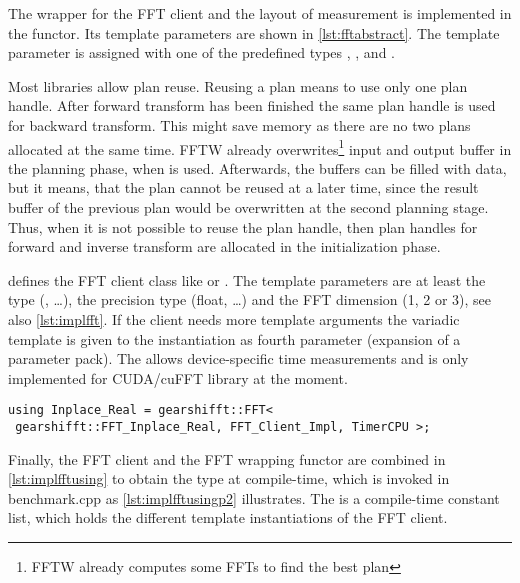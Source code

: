The wrapper for the FFT client and the layout of measurement is implemented in the  functor.
Its template parameters are shown in \cref{lst:fftabstract}. 
The template parameter  is assigned with one of the predefined types , ,  and .

Most libraries allow plan reuse.
Reusing a plan means to use only one plan handle. After forward transform has been finished the same plan handle is used for backward transform.
This might save memory as there are no two plans allocated at the same time. FFTW already overwrites\footnote{FFTW already computes some FFTs to find the best plan} input and output buffer in the planning phase, when  is used. Afterwards, the buffers can be filled with data, but it means, that the plan cannot be reused at a later time, since the result buffer of the previous plan would be overwritten at the second planning stage.
Thus, when it is not possible to reuse the plan handle, then plan handles for forward and inverse transform are allocated in the initialization phase.

 defines the FFT client class like  or .
The template parameters are at least the  type (, \ldots), the precision type (float, \ldots) and the FFT dimension (1, 2 or 3), see also \cref{lst:implfft}. If the client needs more template arguments the variadic template  is given to the  instantiation as fourth parameter (expansion of a parameter pack).
The  allows device-specific time measurements and is only implemented for CUDA/cuFFT library at the moment.

\begin{lstlisting}[caption={Define FFT client types for corresponding FFTs},label={lst:implfftusing}]
using Inplace_Real = gearshifft::FFT<
 gearshifft::FFT_Inplace_Real, FFT_Client_Impl, TimerCPU >;
\end{lstlisting}

Finally, the FFT client and the FFT wrapping functor are combined in \cref{lst:implfftusing} to obtain the type at compile-time, which is invoked in benchmark.cpp as \cref{lst:implfftusingp2} illustrates. The  is a compile-time constant list, which holds the different template instantiations of the FFT client. 

